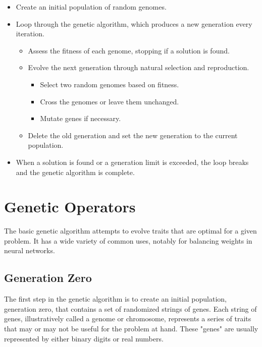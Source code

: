 \documentclass[12pt]{report}
\begin{document}
\begin{itemize}
\item{Create an initial population of random genomes.}
\item{Loop through the genetic algorithm, which produces a new generation every iteration.}

\begin{itemize}
\item{Assess the fitness of each genome, stopping if a solution is found.}
\item{Evolve the next generation through natural selection and reproduction.}

\begin{itemize}
\item{Select two random genomes based on fitness.}
\item{Cross the genomes or leave them unchanged.}
\item{Mutate genes if necessary.}
\end{itemize}
             
\item{Delete the old generation and set the new generation to the current population.}
\end{itemize}
            
\item{When a solution is found or a generation limit is exceeded, the loop breaks and the genetic algorithm is complete.}

\end{itemize} 




\section{Genetic Operators}


The basic genetic algorithm attempts to evolve traits that are optimal for a given problem. It has a wide variety of common uses, notably for balancing weights in neural networks.


\subsection{Generation Zero}
The first step in the genetic algorithm is to create an initial population, generation zero, that contains a set of randomized strings of genes. Each string of genes, illustratively called a genome or chromosome, represents a series of traits that may or may not be useful for the problem at hand. These "genes" are usually represented by either binary digits or real numbers.
\end{document}
